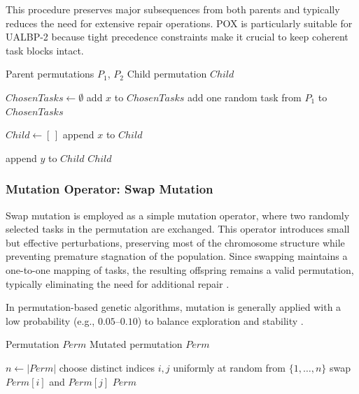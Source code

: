 \documentclass[12pt,a4paper]{article}
\begin{document}
This procedure preserves major subsequences from both parents and typically reduces the need for extensive repair operations. POX is particularly suitable for UALBP-2 because tight precedence constraints make it crucial to keep coherent task blocks intact.
\begin{algorithm}[H]
\caption{POXCrossover (Precedence-Preserving Order Crossover)}
\label{alg:pox}
\begin{algorithmic}[1]
\Require Parent permutations $P_1$, $P_2$
\Ensure Child permutation $Child$

\State $ChosenTasks \gets \emptyset$
        \State add $x$ to $ChosenTasks$
    \EndIf
\EndFor
{}
    \State add one random task from $P_1$ to $ChosenTasks$
\EndIf

\State $Child \gets [\,]$
        \State append $x$ to $Child$
    \EndIf
\EndFor

        \State append $y$ to $Child$
    \EndIf
\EndFor
\State \Return $Child$
\end{algorithmic}
\end{algorithm}


\subsubsection{Mutation Operator: Swap Mutation}
Swap mutation is employed as a simple mutation operator, where two randomly selected tasks in the permutation are exchanged. This operator introduces small but effective perturbations, preserving most of the chromosome structure while preventing premature stagnation of the population. Since swapping maintains a one-to-one mapping of tasks, the resulting offspring remains a valid permutation, typically eliminating the need for additional repair \cite{Reeves1993}.

In permutation-based genetic algorithms, mutation is generally applied with a low probability (e.g., $0.05$--$0.10$) to balance exploration and stability \cite{goldberg_1989}.

\begin{algorithm}[H]
\caption{SwapMutation}
\label{alg:swap}
\begin{algorithmic}[1]
\Require Permutation $Perm$
\Ensure Mutated permutation $Perm$

\State $n \gets |Perm|$
\State choose distinct indices $i,j$ uniformly at random from $\{1,\dots,n\}$
\State swap $Perm[i]$ and $Perm[j]$
\State \Return $Perm$
\end{algorithmic}
\end{algorithm}
\end{document}
